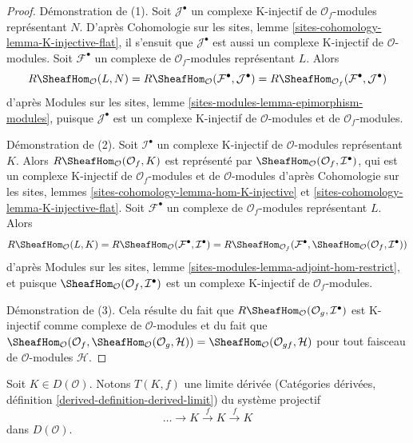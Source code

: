 \begin{proof}
Démonstration de (1). Soit $\mathcal{J}^\bullet$ un complexe K-injectif de
$\mathcal{O}_f$-modules représentant $N$. D'après Cohomologie sur les sites, lemme
\ref{sites-cohomology-lemma-K-injective-flat}, il s'ensuit que
$\mathcal{J}^\bullet$ est aussi un complexe K-injectif de
$\mathcal{O}$-modules. Soit $\mathcal{F}^\bullet$ un complexe de
$\mathcal{O}_f$-modules représentant $L$. Alors
$$
R\SheafHom_\mathcal{O}(L, N) =
R\SheafHom_\mathcal{O}(\mathcal{F}^\bullet, \mathcal{J}^\bullet) =
R\SheafHom_{\mathcal{O}_f}(\mathcal{F}^\bullet, \mathcal{J}^\bullet)
$$
d'après
Modules sur les sites, lemme \ref{sites-modules-lemma-epimorphism-modules},
puisque $\mathcal{J}^\bullet$ est un complexe K-injectif de $\mathcal{O}$-modules
et de $\mathcal{O}_f$-modules.

\medskip\noindent
Démonstration de (2). Soit $\mathcal{I}^\bullet$ un complexe K-injectif de
$\mathcal{O}$-modules représentant $K$.
Alors $R\SheafHom_\mathcal{O}(\mathcal{O}_f, K)$ est représenté par
$\SheafHom_\mathcal{O}(\mathcal{O}_f, \mathcal{I}^\bullet)$, qui est
un complexe K-injectif de $\mathcal{O}_f$-modules et de
$\mathcal{O}$-modules d'après
Cohomologie sur les sites, lemmes \ref{sites-cohomology-lemma-hom-K-injective} et
\ref{sites-cohomology-lemma-K-injective-flat}.
Soit $\mathcal{F}^\bullet$ un complexe de $\mathcal{O}_f$-modules
représentant $L$. Alors
$$
R\SheafHom_\mathcal{O}(L, K) =
R\SheafHom_\mathcal{O}(\mathcal{F}^\bullet, \mathcal{I}^\bullet) =
R\SheafHom_{\mathcal{O}_f}(\mathcal{F}^\bullet,
\SheafHom_\mathcal{O}(\mathcal{O}_f, \mathcal{I}^\bullet))
$$
d'après Modules sur les sites, lemme \ref{sites-modules-lemma-adjoint-hom-restrict},
et puisque $\SheafHom_\mathcal{O}(\mathcal{O}_f, \mathcal{I}^\bullet)$ est un
complexe K-injectif de $\mathcal{O}_f$-modules.

\medskip\noindent
Démonstration de (3). Cela résulte du fait que
$R\SheafHom_\mathcal{O}(\mathcal{O}_g, \mathcal{I}^\bullet)$
est K-injectif comme complexe de $\mathcal{O}$-modules et du fait que
$\SheafHom_\mathcal{O}(\mathcal{O}_f,
\SheafHom_\mathcal{O}(\mathcal{O}_g, \mathcal{H})) = 
\SheafHom_\mathcal{O}(\mathcal{O}_{gf}, \mathcal{H})$
pour tout faisceau de $\mathcal{O}$-modules $\mathcal{H}$.
\end{proof}

\noindent
Soit $K \in D(\mathcal{O})$. Notons
$T(K, f)$ une limite dérivée (Catégories dérivées, définition
\ref{derived-definition-derived-limit}) du système projectif
$$
\ldots \to K \xrightarrow{f} K \xrightarrow{f} K
$$
dans $D(\mathcal{O})$.

